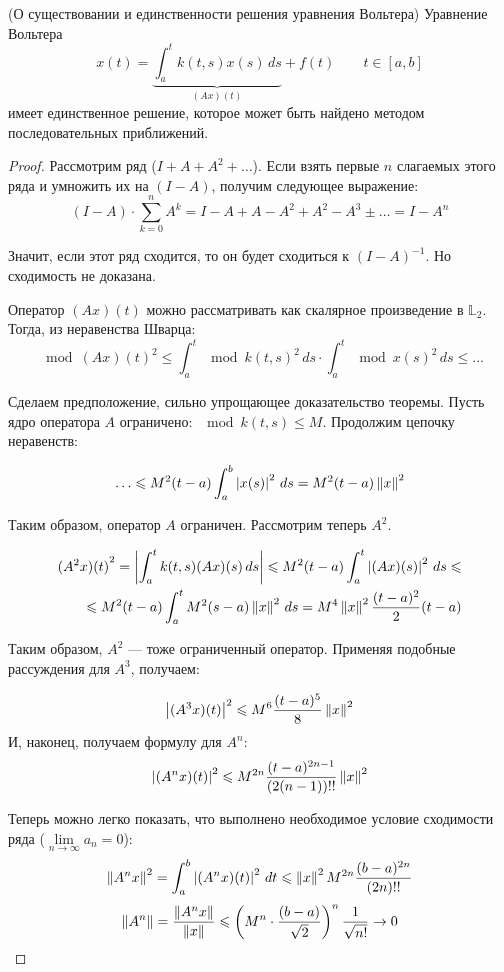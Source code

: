 \documentclass[12pt]{article}
\begin{document}
	\begin{theorem}
		(О существовании и единственности решения уравнения Вольтера)
		Уравнение Вольтера
		$$x(t) = \underbrace{\int_a^t k(t,s) x(s) \, ds}_{(Ax)(t)} + f(t) \qquad t\in [a,b]$$
		имеет единственное решение, которое может быть найдено методом последовательных приближений.
	\end{theorem}		
	
	\begin{proof}
		Рассмотрим ряд ($I + A + A^2 + \ldots$). Если взять первые $n$ слагаемых этого ряда и умножить их на $(I - A)$, 
		получим следующее выражение:
		$$(I-A) \cdot \sum_{k=0}^n A^k = I - A + A - A^2 + A^2 - A^3 \pm\ldots = I - A^n$$
		
		Значит, если этот ряд сходится, то он будет сходиться к $(I - A)^{-1}$. Но сходимость не доказана.
		
		Оператор $(Ax)(t)$ можно рассматривать как скалярное произведение в $\mathbb{L}_2$. Тогда, из неравенства Шварца:
		$$\mod{(Ax)(t)}^2 \leq 
		  \int_a^t \mod{k(t,s)}^2 \,ds \cdot \int_a^t \mod{x(s)}^2 \,ds \leq \ldots$$
		  
		Сделаем предположение, сильно упрощающее доказательство теоремы. Пусть ядро оператора $A$ 
		ограничено: $\mod{k(t,s)} \leq M$. Продолжим цепочку неравенств:
		
		$$\ldots \leqslant M^2(t-a) \int_a^b \left| x(s) \right|^2 \,ds = M^2(t-a)\left\| x \right\|^2$$
		
		Таким образом, оператор $A$ ограничен. Рассмотрим теперь $A^2$.
		
		\begin{align*}
			{(A^2x)(t)}^2 = \left| \int_a^t k(t,s)(Ax)(s) \,ds \right| \leqslant M^2(t-a)\int_a^t\left| (Ax)(s) \right|^2\,ds \leqslant \\ 
			\leqslant M^2(t-a)\int_a^tM^2(s-a)\left\| x \right\|^2 \,ds = M^4 \left\| x \right\|^2 \frac{(t-a)^2}{2}(t-a)
		\end{align*}
		
		Таким образом, $A^2$ --- тоже ограниченный оператор. Применяя подобные рассуждения для $A^3$, получаем:
		
		$$\left| (A^3x)(t) \right|^2 \leqslant M^6 \frac{(t-a)^5}{8}\left\| x \right\|^2 $$
		И, наконец, получаем формулу для $A^n$:
		$$\left| (A^nx)(t) \right|^2 \leqslant M^{2n} \frac{(t-a)^{2n-1}}{(2(n-1))!!}\left\| x \right\|^2 $$
		
		Теперь можно легко показать, что выполнено необходимое условие сходимости ряда 
		($\underset{n\rightarrow\infty}{\lim} a_n = 0$):
		$$\left\| A^nx \right\|^2 = \int_a^b \left| (A^nx)(t) \right|^2 \,dt \leqslant \left\| x \right\|^2 M^{2n} \frac{(b-a)^{2n}}{(2n)!!}$$
		$$\left\| A^n \right\| = \frac{\left\| A^nx \right\|}{\left\| x \right\|} \leqslant 
		  \left( M^n\cdot\frac{(b-a)}{\sqrt{2}}\right)^n \frac{1}{\sqrt{n!}} \rightarrow 0$$
		  

\end{proof}
\end{document}

